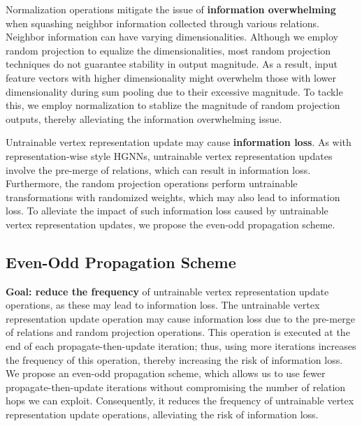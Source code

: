 \documentclass[lettersize,journal]{IEEEtran}
\begin{document}
Normalization operations mitigate the issue of \textbf{information overwhelming} when squashing neighbor information collected through various relations. 
Neighbor information can have varying dimensionalities. 
Although we employ random projection to equalize the dimensionalities, most random projection techniques do not guarantee stability in output magnitude. 
As a result, input feature vectors with higher dimensionality might overwhelm those with lower dimensionality during sum pooling due to their excessive magnitude. 
To tackle this, we employ normalization to stablize the magnitude of random projection outputs, thereby alleviating the information overwhelming issue.





Untrainable vertex representation update may cause \textbf{information loss}.
As with representation-wise style HGNNs, untrainable vertex representation updates involve the pre-merge of relations, which can result in information loss.
Furthermore, the random projection operations perform untrainable transformations with randomized weights, which may also lead to information loss.
To alleviate the impact of such information loss caused by untrainable vertex representation updates, we propose the even-odd propagation scheme.







\subsection{Even-Odd Propagation Scheme}\label{sec:even_odd_prop}

\textbf{Goal: reduce the frequency} of untrainable vertex representation update operations, as these may lead to information loss.
The untrainable vertex representation update operation may cause information loss due to the pre-merge of relations and random projection operations.
This operation is executed at the end of each propagate-then-update iteration; thus, using more iterations increases the frequency of this operation, thereby increasing the risk of information loss.
We propose an even-odd propagation scheme, which allows us to use fewer propagate-then-update iterations without compromising the number of relation hops we can exploit.
Consequently, it reduces the frequency of untrainable vertex representation update operations, alleviating the risk of information loss.
\end{document}
